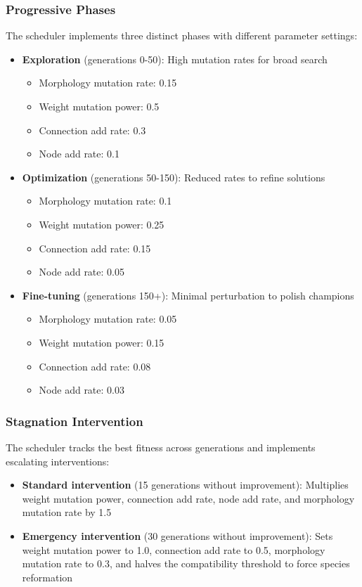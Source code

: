 \documentclass[conference]{IEEEtran}
\begin{document}
\subsubsection{Progressive Phases}
The scheduler implements three distinct phases with different parameter settings:
\begin{itemize}
    \item \textbf{Exploration} (generations 0-50): High mutation rates for broad search
    \begin{itemize}
        \item Morphology mutation rate: 0.15
        \item Weight mutation power: 0.5
        \item Connection add rate: 0.3
        \item Node add rate: 0.1
    \end{itemize}
    \item \textbf{Optimization} (generations 50-150): Reduced rates to refine solutions
    \begin{itemize}
        \item Morphology mutation rate: 0.1
        \item Weight mutation power: 0.25
        \item Connection add rate: 0.15
        \item Node add rate: 0.05
    \end{itemize}
    \item \textbf{Fine-tuning} (generations 150+): Minimal perturbation to polish champions
    \begin{itemize}
        \item Morphology mutation rate: 0.05
        \item Weight mutation power: 0.15
        \item Connection add rate: 0.08
        \item Node add rate: 0.03
    \end{itemize}
\end{itemize}

\subsubsection{Stagnation Intervention}
The scheduler tracks the best fitness across generations and implements escalating interventions:
\begin{itemize}
    \item \textbf{Standard intervention} (15 generations without improvement): Multiplies weight mutation power, connection add rate, node add rate, and morphology mutation rate by 1.5
    \item \textbf{Emergency intervention} (30 generations without improvement): Sets weight mutation power to 1.0, connection add rate to 0.5, morphology mutation rate to 0.3, and halves the compatibility threshold to force species reformation
\end{itemize}
\end{document}
